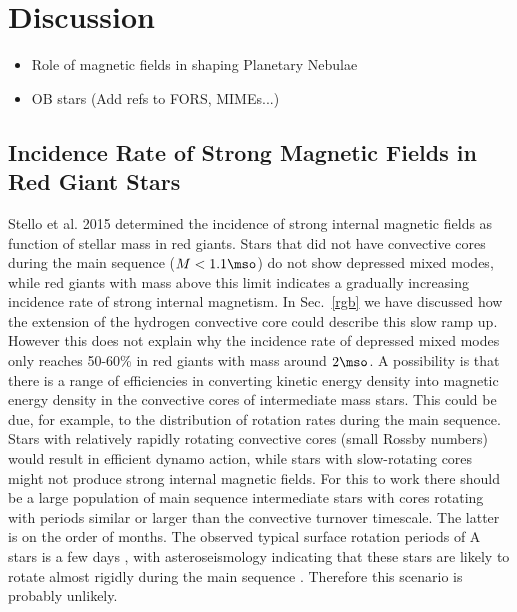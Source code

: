 \section{Discussion}
\begin{itemize}
\item Role of magnetic fields in shaping Planetary Nebulae
\item OB stars (Add refs to FORS, MIMEs...)
\end{itemize}

\subsection{Incidence Rate of Strong Magnetic Fields in Red Giant Stars}
Stello et al. 2015 determined the incidence of strong internal magnetic fields as function of stellar mass in red giants. Stars that did not have convective cores during the main sequence ($M<1.1\mso$) do not show depressed mixed modes, while red giants with mass above this limit indicates a gradually increasing incidence rate of strong internal magnetism.    In Sec.~\ref{rgb} we have discussed how the extension of the hydrogen convective core could describe this slow ramp up. However this does not explain why the incidence rate of depressed mixed modes only reaches 50-60\% in red giants with mass around $2\mso$.
A possibility is that there is a range of efficiencies in converting kinetic energy density into magnetic energy density in the convective cores of intermediate mass stars. This could be due, for example, to the distribution of rotation rates during the main sequence. Stars with relatively rapidly rotating convective cores (small Rossby numbers) would result in efficient dynamo action, while stars with slow-rotating cores might not produce strong internal magnetic fields. For this to work there should be a large population of main sequence intermediate stars with cores rotating with periods similar or larger than the convective turnover timescale. The latter is on the order of months. The  observed typical surface rotation periods of A stars is a few days \citep{Zorec_2012}, with  asteroseismology indicating that these stars are likely to rotate almost rigidly during the main sequence \citep[e.g.][]{Benomar_2015}. Therefore this scenario is probably unlikely.

